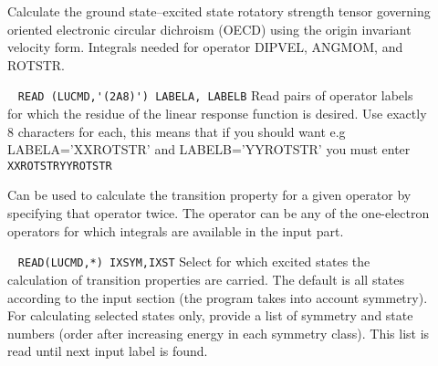 \begin{description}
\item[] 
%
Calculate the ground state--excited state rotatory strength tensor governing oriented electronic circular dichroism
(OECD) using the origin invariant velocity form.
Integrals needed for operator DIPVEL, ANGMOM, and ROTSTR.

\item[] \verb| |\newline
\verb|READ (LUCMD,'(2A8)') LABELA, LABELB|\newline
%
Read pairs of operator labels for which the residue of the linear response function is desired.
Use exactly 8 characters for each,
this means that if you should want e.g LABELA='XXROTSTR' and LABELB='YYROTSTR'
you must enter\newline
\verb|XXROTSTRYYROTSTR|

Can be used to calculate the transition property for a given operator
by specifying that operator twice. The operator can be any of the one-electron
operators for which integrals are available in the  input part.

\item[]\verb| |\newline 
\verb|READ(LUCMD,*) IXSYM,IXST|\newline
%
Select for which excited states the calculation of transition properties
are carried. The default is all states according to the  input section
(the program takes into account symmetry). For calculating selected states only,
provide a list of symmetry and state numbers (order after increasing energy in 
each symmetry class). This list is read until next input label is found.

\end{description}
